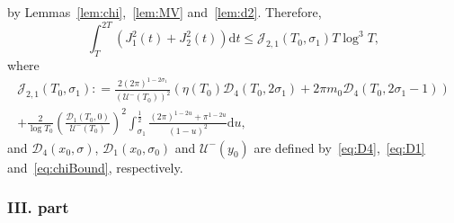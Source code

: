 \documentclass[a4paper,reqno]{amsart}
\theoremstyle{definition}
\newcommand{\de}[0]{\mathrel{\mathop:}=}
\newcommand{\dif}[1]{\mathrm{d}#1}
\begin{document}
by Lemmas~\ref{lem:chi},~\ref{lem:MV} and~\ref{lem:d2}. Therefore,
\begin{equation}
\label{eq:J1J2square}
\int_{T}^{2T}\left(J_1^2(t)+J_2^2(t)\right)\dif{t} \leq \mathcal{J}_{2,1}(T_0,\sigma_1)T\log^{3}{T},
\end{equation}
where
\begin{multline}
\label{eq:cJ21}
\mathcal{J}_{2,1}(T_0,\sigma_1) \de \frac{2(2\pi)^{1-2\sigma_1}}{\left(\mathcal{U}^{-}(T_0)\right)^2}\left(\eta(T_0)\mathcal{D}_{4}(T_0,2\sigma_1)+2\pi m_0\mathcal{D}_{4}(T_0,2\sigma_1-1)\right) \\ 
+ \frac{2}{\log{T_0}}\left(\frac{\mathcal{D}_1(T_0,0)}{\mathcal{U}^{-}(T_0)}\right)^{2}\int_{\sigma_1}^{\frac{1}{2}}\frac{(2\pi)^{1-2u}+\pi^{1-2u}}{(1-u)^2}\dif{u},
\end{multline}
and $\mathcal{D}_{4}(x_0,\sigma)$, $\mathcal{D}_{1}(x_0,\sigma_0)$ and $\mathcal{U}^{-}(y_0)$ are defined by~\eqref{eq:D4},~\eqref{eq:D1} and~\eqref{eq:chiBound}, respectively.

\subsubsection{III. part}
\end{document}
